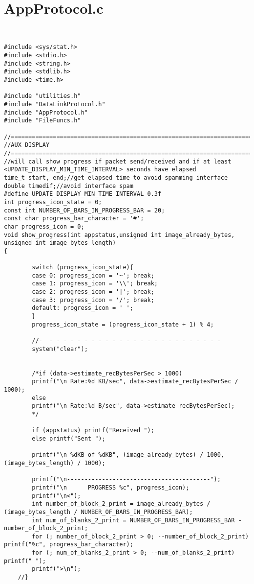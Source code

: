 \section{AppProtocol.c}
\label{APPPROTOCOLC}

\begin{lstlisting}


#include <sys/stat.h>
#include <stdio.h>
#include <string.h>
#include <stdlib.h>
#include <time.h> 

#include "utilities.h"
#include "DataLinkProtocol.h"
#include "AppProtocol.h"
#include "FileFuncs.h"

//================================================================================================================
//AUX DISPLAY
//================================================================================================================
//will call show progress if packet send/received and if at least <UPDATE_DISPLAY_MIN_TIME_INTERVAL> seconds have elapsed
time_t start, end;//get elapsed time to avoid spamming interface
double timedif;//avoid interface spam
#define UPDATE_DISPLAY_MIN_TIME_INTERVAL 0.3f
int progress_icon_state = 0;
const int NUMBER_OF_BARS_IN_PROGRESS_BAR = 20;
const char progress_bar_character = '#';
char progress_icon = 0;
void show_progress(int appstatus,unsigned int image_already_bytes, unsigned int image_bytes_length)
{

		switch (progress_icon_state){
		case 0: progress_icon = '~'; break;
		case 1: progress_icon = '\\'; break;
		case 2: progress_icon = '|'; break;
		case 3: progress_icon = '/'; break;
		default: progress_icon = ' ';
		}
		progress_icon_state = (progress_icon_state + 1) % 4;

		//-  - - - - - - - - - - - - - - - - - - - - - - - - -
		system("clear");


		/*if (data->estimate_recBytesPerSec > 1000)
		printf("\n Rate:%d KB/sec", data->estimate_recBytesPerSec / 1000);
		else
		printf("\n Rate:%d B/sec", data->estimate_recBytesPerSec);
		*/

		if (appstatus) printf("Received ");
		else printf("Sent ");

		printf("\n %dKB of %dKB", (image_already_bytes) / 1000, (image_bytes_length) / 1000);

		printf("\n-----------------------------------------");
		printf("\n      PROGRESS %c", progress_icon);
		printf("\n<");
		int number_of_block_2_print = image_already_bytes / (image_bytes_length / NUMBER_OF_BARS_IN_PROGRESS_BAR);
		int num_of_blanks_2_print = NUMBER_OF_BARS_IN_PROGRESS_BAR - number_of_block_2_print;
		for (; number_of_block_2_print > 0; --number_of_block_2_print) printf("%c", progress_bar_character);
		for (; num_of_blanks_2_print > 0; --num_of_blanks_2_print) printf(" ");
		printf(">\n");
	//}


\end{lstlisting}
